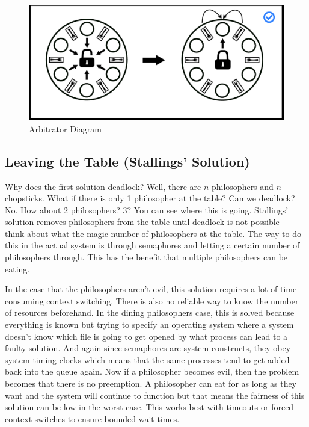 \begin{figure}[H]
	\centering
	\includegraphics[width=.9\textwidth]{deadlock/drawings/dining_arbitrator.eps}
	\caption{Arbitrator Diagram}
\end{figure}

\subsection{Leaving the Table (Stallings' Solution)}

Why does the first solution deadlock?
Well, there are $n$ philosophers and $n$ chopsticks.
What if there is only 1 philosopher at the table?
Can we deadlock?
No.
How about 2 philosophers?
3?
You can see where this is going.
Stallings' \cite[P. 280]{stalling} solution removes philosophers from the table until deadlock is not possible -- think about what the magic number of philosophers at the table.
The way to do this in the actual system is through semaphores and letting a certain number of philosophers through.
This has the benefit that multiple philosophers can be eating.

In the case that the philosophers aren't evil, this solution requires a lot of time-consuming context switching.
There is also no reliable way to know the number of resources beforehand.
In the dining philosophers case, this is solved because everything is known but trying to specify an operating system where a system doesn't know which file is going to get opened by what process can lead to a faulty solution.
And again since semaphores are system constructs, they obey system timing clocks which means that the same processes tend to get added back into the queue again.
Now if a philosopher becomes evil, then the problem becomes that there is no preemption.
A philosopher can eat for as long as they want and the system will continue to function but that means the fairness of this solution can be low in the worst case.
This works best with timeouts or forced context switches to ensure bounded wait times.

